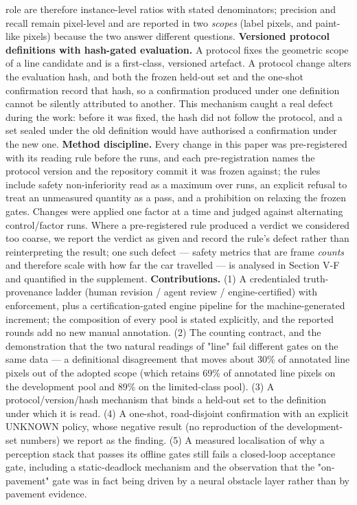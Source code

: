 \documentclass[journal]{IEEEtran}
\begin{document}
role are therefore instance-level ratios with stated denominators; precision and recall remain
pixel-level and are reported in two \emph{scopes} (label pixels, and paint-like pixels) because the two
answer different questions.
\textbf{Versioned protocol definitions with hash-gated evaluation.} A protocol fixes the geometric scope
of a line candidate and is a first-class, versioned artefact. A protocol change alters the evaluation
hash, and both the frozen held-out set and the one-shot confirmation record that hash, so a
confirmation produced under one definition cannot be silently attributed to another. This
mechanism caught a real defect during the work: before it was fixed, the hash did not follow the
protocol, and a set sealed under the old definition would have authorised a confirmation under the
new one.
\textbf{Method discipline.} Every change in this paper was pre-registered with its reading rule before
the runs, and each
pre-registration names the protocol version and the repository commit it was frozen against; the rules include safety non-inferiority read as a maximum over runs, an explicit refusal
to treat an unmeasured quantity as a pass, and a prohibition on relaxing the frozen gates. Changes
were applied one factor at a time and judged against alternating control/factor runs. Where a
pre-registered rule produced a verdict we considered too coarse, we report the verdict as given and
record the rule's defect rather than reinterpreting the result; one such defect --- safety metrics
that are frame \emph{counts} and therefore scale with how far the car travelled --- is analysed in
Section V-F and quantified in the supplement.
\textbf{Contributions.} (1) A credentialed truth-provenance ladder (human revision / agent review / engine-certified) with enforcement, plus a
certification-gated engine pipeline for the machine-generated increment; the composition of every pool is stated
explicitly, and the reported rounds add no new manual annotation. (2) The counting contract, and the demonstration that the two
natural readings of "line" fail different gates on the same data --- a definitional disagreement that moves
about 30\% of annotated line pixels out of the adopted scope (which retains 69\% of annotated line pixels on
the development pool and 89\% on the limited-class pool). (3) A protocol/version/hash mechanism that binds a held-out set to the
definition under which it is read. (4) A one-shot, road-disjoint confirmation with an explicit
UNKNOWN policy, whose negative result (no reproduction of the development-set numbers) we report as
the finding. (5) A measured localisation of why a perception stack that passes its offline gates
still fails a closed-loop acceptance gate, including a static-deadlock mechanism and the observation
that the "on-pavement" gate was in fact being driven by a neural obstacle layer rather than by
pavement evidence.
\end{document}
